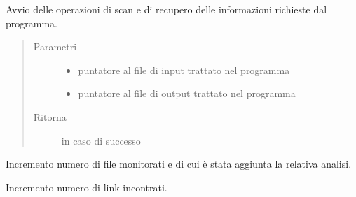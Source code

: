 \documentclass[letterpaper,10pt,italian,openany,oneside]{sphinxmanual}
\begin{document}

\begin{fulllineitems}
\label{\detokenize{code/scan:c.startScan}}
Avvio delle operazioni di scan e di recupero delle informazioni richieste dal programma.
\begin{quote}\begin{description}
\item[{Parametri}] \leavevmode\begin{itemize}
\item {} 
 \textendash{} puntatore al file di input trattato nel programma

\item {} 
 \textendash{} puntatore al file di output trattato nel programma

\end{itemize}

\item[{Ritorna}]  in caso di successo

\end{description}\end{quote}

\end{fulllineitems}


\begin{fulllineitems}
\label{\detokenize{code/scan:c.increaseMonitorati}}
Incremento numero di file monitorati e di cui è stata aggiunta la relativa analisi.

\end{fulllineitems}


\begin{fulllineitems}
\label{\detokenize{code/scan:c.increaseLink}}
Incremento numero di link incontrati.

\end{fulllineitems}
\end{document}
